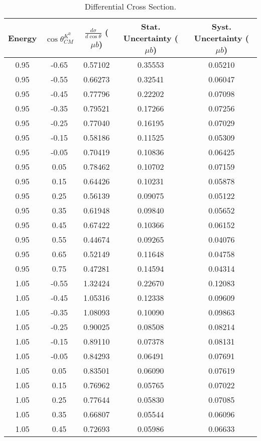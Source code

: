 \begin{longtable}{ccccc}
\caption{Differential Cross Section.}\\
\toprule
{\bf Energy} & {\bf $\cos\theta^{K^{0}}_{CM}$ } & {\bf $\frac{d\sigma}{d\cos\theta}$ ($\mu b$)} & {\bf Stat. Uncertainty ($\mu b$)} & {\bf Syst. Uncertainty ($\mu b$)}\\ \midrule\endhead
0.95 & -0.65 & 0.57102 & 0.35553 & 0.05210 \\ 
0.95 & -0.55 & 0.66273 & 0.32541 & 0.06047 \\ 
0.95 & -0.45 & 0.77796 & 0.22202 & 0.07098 \\ 
0.95 & -0.35 & 0.79521 & 0.17266 & 0.07256 \\ 
0.95 & -0.25 & 0.77040 & 0.16195 & 0.07029 \\ 
0.95 & -0.15 & 0.58186 & 0.11525 & 0.05309 \\ 
0.95 & -0.05 & 0.70419 & 0.10836 & 0.06425 \\ 
0.95 & 0.05 & 0.78462 & 0.10702 & 0.07159 \\ 
0.95 & 0.15 & 0.64426 & 0.10231 & 0.05878 \\ 
0.95 & 0.25 & 0.56139 & 0.09075 & 0.05122 \\ 
0.95 & 0.35 & 0.61948 & 0.09840 & 0.05652 \\ 
0.95 & 0.45 & 0.67422 & 0.10366 & 0.06152 \\ 
0.95 & 0.55 & 0.44674 & 0.09265 & 0.04076 \\ 
0.95 & 0.65 & 0.52149 & 0.11648 & 0.04758 \\ 
0.95 & 0.75 & 0.47281 & 0.14594 & 0.04314 \\ \hline
1.05 & -0.55 & 1.32424 & 0.22670 & 0.12083 \\ 
1.05 & -0.45 & 1.05316 & 0.12338 & 0.09609 \\ 
1.05 & -0.35 & 1.08093 & 0.10090 & 0.09863 \\ 
1.05 & -0.25 & 0.90025 & 0.08508 & 0.08214 \\ 
1.05 & -0.15 & 0.89110 & 0.07378 & 0.08131 \\ 
1.05 & -0.05 & 0.84293 & 0.06491 & 0.07691 \\ 
1.05 & 0.05 & 0.83501 & 0.06090 & 0.07619 \\ 
1.05 & 0.15 & 0.76962 & 0.05765 & 0.07022 \\ 
1.05 & 0.25 & 0.77644 & 0.05830 & 0.07085 \\ 
1.05 & 0.35 & 0.66807 & 0.05544 & 0.06096 \\ 
1.05 & 0.45 & 0.72693 & 0.05986 & 0.06633 \\ 

\end{longtable}

